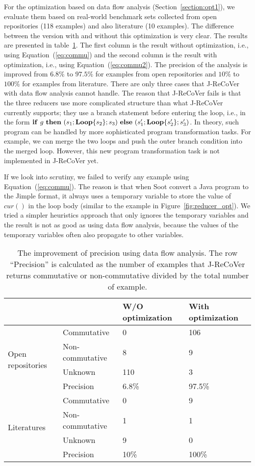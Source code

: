 \documentclass{llncs}
\newcommand{\cur}{cur()}
\newcommand{\ite}[3]{
	 \ifmmode
	 \mathbf{if}\ #1 \ \mathbf{then}\ #2\  \mathbf{else}\ #3
	 \else
	 \textbf{if}\ #1 \ \textbf{then}\ #2\  \textbf{else}\ #3
	 \fi}
\newcommand{\rloop}{
	\ifmmode
	\mathbf{Loop}
	\else
	\textbf{Loop}
	\fi}
\begin{document}
For the optimization based on data flow analysis (Section~\ref{section:opt1}), we evaluate them based on real-world benchmark sets collected from open repositories (118 examples) and also literature (10 examples). The difference between the version with and without this optimization is very clear. The results are presented in table~\ref{tab:opt1}. The first column is the result without optimization, i.e., using Equation~(\ref{eq:commu}) and the second column is the result with optimization, i.e., using Equation~(\ref{eq:commu2}). The precision of the analysis is improved from $6.8\%$ to $97.5\%$ for examples from open repositories and
$10\%$ to $100\%$ for examples from literature. There are only three cases that J-ReCoVer with data flow analysis cannot handle. The reason that J-ReCoVer fails is that the three reducers use more complicated structure than what J-ReCoVer currently supports; they use a branch statement before entering the loop, i.e., in the form $\ite{g}{(s_1;\rloop\{s_2\};s_3)}{(s'_1;\rloop\{s'_2\};s'_3)}$. In theory, such program can be handled by more sophisticated program transformation tasks. For example, we can merge the two loops and push the outer branch condition into the merged loop. 
However, this new program transformation task is not implemented in J-ReCoVer yet.

If we look into scrutiny, we failed to verify any example using Equation~(\ref{eq:commu}). The reason is that when Soot convert a Java program to the Jimple format, it always uses a temporary variable to store the value of $\cur$ in the loop body (similar to the example in Figure~\ref{fig:reducer_opt}). We tried a simpler heuristics approach that only ignores the temporary variables and the result is not as good as using data flow analysis, because the values of the temporary variables often also propagate to other variables. 
\begin{table}[htb]
	\centering
	\begin{tabular}{|l|l|l|l|}
		\hline
		& &W/O optimization	& With optimization\\
		\hline
		\hline
		\multirow{4}{*}{Open repositories}&Commutative& 0&106\\
		\cline{2-4}
		&Non-commutative&8&9\\
		\cline{2-4}
		&Unknown&110&3\\
		\cline{2-4}
		&Precision& 6.8\% & 97.5\%\\
		\hline
		\hline
		\multirow{4}{*}{Literatures}&Commutative& 0&9\\
		\cline{2-4}
		&Non-commutative&1&1\\
		\cline{2-4}
		&Unknown&9&0\\
		\cline{2-4}
		&Precision& 10\% & 100\%\\
		\hline
	\end{tabular}
	\caption{The improvement of precision using data flow analysis. The row ``Precision'' is calculated as the number of examples that J-ReCoVer returns commutative or non-commutative divided by the total number of example.}
	\label{tab:opt1}
\end{table}
\end{document}
